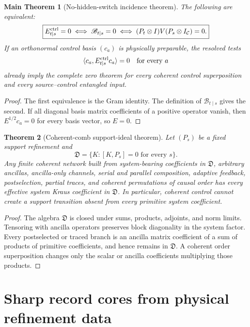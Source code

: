 \documentclass[11pt,oneside,openany]{book}
\numberwithin{equation}{chapter}
\newtheorem{theorem}{Theorem}[chapter]
\newtheorem{maintheorem}[theorem]{Main Theorem}
\theoremstyle{definition}
\theoremstyle{remark}
\begin{document}
\begin{maintheorem}[No-hidden-switch incidence theorem]
\label{thm:v6-no-hidden-switch}
The following are equivalent:
\[
 \boxed{
 E_{t\mid s}^{\rm ctrl}=0
 \iff
 \mathscr B_{t\mid s}=0
 \iff
 (P_t\otimes I)V(P_s\otimes I_{\mathcal C})=0.}
\]
If an orthonormal control basis \((c_a)\) is physically preparable, the
resolved tests
\[
 \langle c_a,E_{t\mid s}^{\rm ctrl}c_a\rangle=0
 \quad\text{for every }a
\]
already imply the complete zero theorem for every coherent control
superposition and every source--control entangled input.
\end{maintheorem}

\begin{proof}
The first equivalence is the Gram identity.  The definition of
\(\mathscr B_{t\mid s}\) gives the second.  If all diagonal basis matrix
coefficients of a positive operator vanish, then
\(E^{1/2}c_a=0\) for every basis vector, so \(E=0\).
\end{proof}

\begin{theorem}[Coherent-comb support-ideal theorem]
\label{thm:v6-comb-ideal}
Let \((P_s)\) be a fixed support refinement and
\[
 \mathfrak D=\{K:[K,P_s]=0\text{ for every }s\}.
\]
Any finite coherent network built from system-bearing coefficients in
\(\mathfrak D\), arbitrary ancillas, ancilla-only channels, serial and
parallel composition, adaptive feedback, postselection, partial traces, and
coherent permutations of causal order has every effective system Kraus
coefficient in \(\mathfrak D\).  In particular, coherent control cannot create
a support transition absent from every primitive system coefficient.
\end{theorem}

\begin{proof}
The algebra \(\mathfrak D\) is closed under sums, products, adjoints, and norm
limits.  Tensoring with ancilla operators preserves block diagonality in the
system factor.  Every postselected or traced branch is an ancilla matrix
coefficient of a sum of products of primitive coefficients, and hence remains
in \(\mathfrak D\).  A coherent order superposition changes only the scalar or
ancilla coefficients multiplying those products.
\end{proof}

\section{Sharp record cores from physical refinement data}
\end{document}
